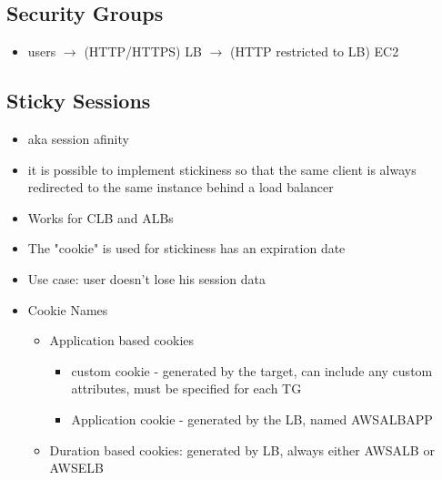 \documentclass[]{scrartcl}
\begin{document}
\subsection{Security Groups}
\begin{itemize}
	\item users $\rightarrow$ (HTTP/HTTPS) LB $\rightarrow$ (HTTP restricted to LB) EC2
\end{itemize}

\subsection{Sticky Sessions}
\begin{itemize}
	\item aka session afinity
	\item it is possible to implement stickiness so that the same client is always redirected to the same instance behind a load balancer
	\item Works for CLB and ALBs
	\item The "cookie" is used for stickiness has an expiration date
	\item Use case: user doesn't lose his session data
	\item Cookie Names
	\begin{itemize}
		\item Application based cookies
		\begin{itemize}
			\item custom cookie - generated by the target, can include any custom attributes, must be specified for each TG
			\item Application cookie - generated by the LB, named AWSALBAPP
		\end{itemize}
		\item Duration based cookies: generated by LB, always either AWSALB or AWSELB
	\end{itemize} 
\end{itemize}
\end{document}
